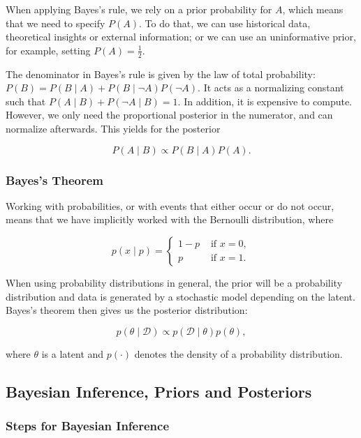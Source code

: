 When applying Bayes's rule, we rely on a prior probability for $A$, which means that we need to specify $P(A)$. To do that, we can use historical data, theoretical insights or external information; or we can use an uninformative prior, for example, setting $P(A) = \frac{1}{2}$.

The denominator in Bayes's rule is given by the law of total probability: $P(B) = P(B\mid A) + P(B\mid \lnot A) P(\lnot A)$. It acts as a normalizing constant such that $P(A\mid B) + P(\lnot A \mid B) = 1$. In addition, it is expensive to compute. However, we only need the proportional posterior in the numerator, and can normalize afterwards. This yields for the posterior

\begin{equation}
	P(A\mid B) \propto P(B\mid A)P(A). 
\end{equation}

\subsubsection{Bayes's Theorem}

Working with probabilities, or with events that either occur or do not occur, means that we have implicitly worked with the Bernoulli distribution, where

\begin{equation}
	p(x\mid p) =
	\begin{cases}
		1-p & \text{ if } x= 0, \\
		p & \text{ if } x = 1.
	\end{cases}
\end{equation}

When using probability distributions in general, the prior will be a probability distribution and data is generated by a stochastic model depending on the latent. Bayes's theorem then gives us the posterior distribution:

\begin{equation}
	p(\theta\mid \mathcal{D})\propto p(\mathcal{D}\mid\theta)p(\theta),
\end{equation}

where $\theta$ is a latent and $p(\cdot)$ denotes the density of a probability distribution.

\subsection{Bayesian Inference, Priors and Posteriors}

\subsubsection{Steps for Bayesian Inference}

